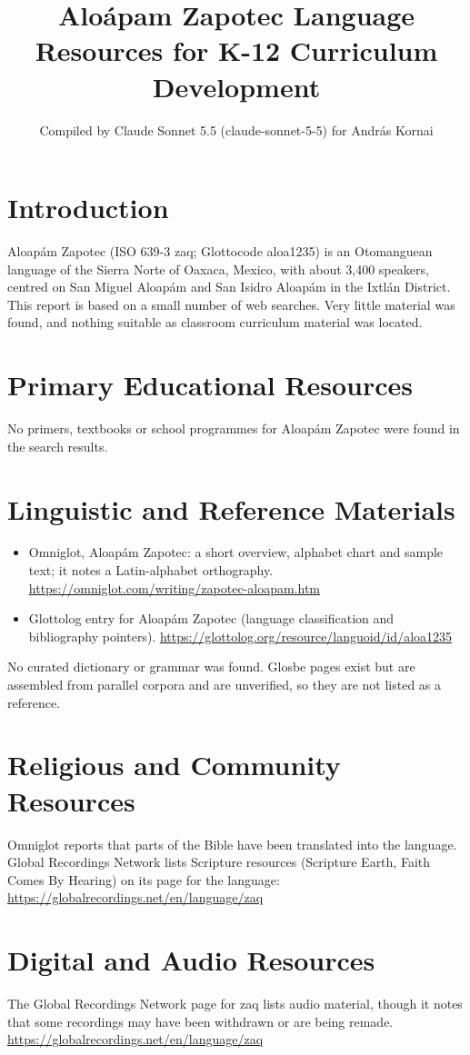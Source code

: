 \documentclass[12pt]{article}
\title{Aloápam Zapotec Language Resources for K-12 Curriculum Development}
\author{Compiled by Claude Sonnet 5.5 (claude-sonnet-5-5) for Andr\'as Kornai}
\date{}
\begin{document}
\maketitle

\section{Introduction}
Aloap\'am Zapotec (ISO 639-3 zaq; Glottocode aloa1235) is an Otomanguean language of the Sierra Norte of Oaxaca, Mexico, with about 3,400 speakers, centred on San Miguel Aloap\'am and San Isidro Aloap\'am in the Ixtl\'an District. This report is based on a small number of web searches. Very little material was found, and nothing suitable as classroom curriculum material was located.

\section{Primary Educational Resources}
No primers, textbooks or school programmes for Aloap\'am Zapotec were found in the search results.

\section{Linguistic and Reference Materials}
\begin{itemize}
\item Omniglot, Aloap\'am Zapotec: a short overview, alphabet chart and sample text; it notes a Latin-alphabet orthography. \url{https://omniglot.com/writing/zapotec-aloapam.htm}
\item Glottolog entry for Aloap\'am Zapotec (language classification and bibliography pointers). \url{https://glottolog.org/resource/languoid/id/aloa1235}
\end{itemize}
No curated dictionary or grammar was found. Glosbe pages exist but are assembled from parallel corpora and are unverified, so they are not listed as a reference.

\section{Religious and Community Resources}
Omniglot reports that parts of the Bible have been translated into the language. Global Recordings Network lists Scripture resources (Scripture Earth, Faith Comes By Hearing) on its page for the language: \url{https://globalrecordings.net/en/language/zaq}

\section{Digital and Audio Resources}
The Global Recordings Network page for zaq lists audio material, though it notes that some recordings may have been withdrawn or are being remade. \url{https://globalrecordings.net/en/language/zaq}
\end{document}
